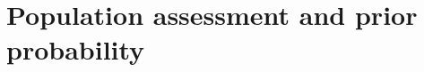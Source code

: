 \documentclass[utf8]{FrontiersinHarvard} %
\renewcommand*{\|}[1][]{\nonscript\:#1\vert\nonscript\:\mathopen{}}
\begin{document}
\medskip











\clearpage
\section{Population assessment and prior probability}
\label{sec:population_step}
\end{document}
